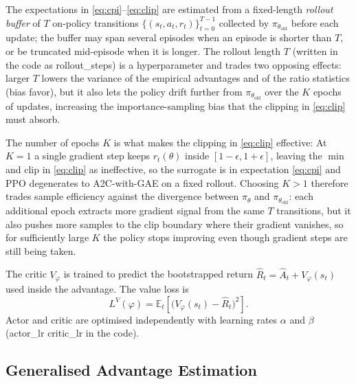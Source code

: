 \documentclass{article}
\theoremstyle{plain}
\theoremstyle{definition}
\theoremstyle{remark}
\begin{document}
The expectations in \cref{eq:cpi}--\cref{eq:clip} are estimated from a fixed-length \emph{rollout buffer} of $T$ on-policy transitions $\{(s_t,a_t,r_t)\}_{t=0}^{T-1}$ collected by $\pi_{\theta_{\mathrm{old}}}$ before each update; the buffer may span several episodes when an episode is shorter than $T$, or be truncated mid-episode when it is longer. The rollout length $T$ (written in the code as rollout\_steps) is a hyperparameter and trades two opposing effects: larger $T$ lowers the variance of the empirical advantages and of the ratio statistics (bias favor), but it also lets the policy drift further from $\pi_{\theta_{\mathrm{old}}}$ over the $K$ epochs of updates, increasing the importance-sampling bias that the clipping in \cref{eq:clip} must absorb.

The number of epochs $K$ is what makes the clipping in \cref{eq:clip} effective: At $K=1$ a single gradient step keeps $r_t(\theta)$ inside $[1-\epsilon,1+\epsilon]$, leaving the $\min$ and $\mathrm{clip}$ in \cref{eq:clip} as ineffective, so the surrogate is in expectation \cref{eq:cpi} and PPO degenerates to A2C-with-GAE on a fixed rollout. Choosing $K>1$ therefore trades sample efficiency against the divergence between $\pi_\theta$ and $\pi_{\theta_{\mathrm{old}}}$: each additional epoch extracts more gradient signal from the same $T$ transitions, but it also pushes more samples to the clip boundary where their gradient vanishes, so for sufficiently large $K$ the policy stops improving even though gradient steps are still being taken.

The critic $V_\varphi$ is trained to predict the bootstrapped return $\hat R_t = \hat A_t + V_\varphi(s_t)$ used inside the advantage. The value loss is
\begin{equation}
    L^{V}(\varphi) = \mathbb{E}_t\!\left[\big(V_\varphi(s_t) - \hat R_t\big)^{2}\right].
    \label{eq:vloss}
\end{equation}
Actor and critic are optimised independently with learning rates $\alpha$ and $\beta$ (actor\_lr critic\_lr in the code).

\subsection{Generalised Advantage Estimation}\label{sec:theory:gae}
\end{document}
